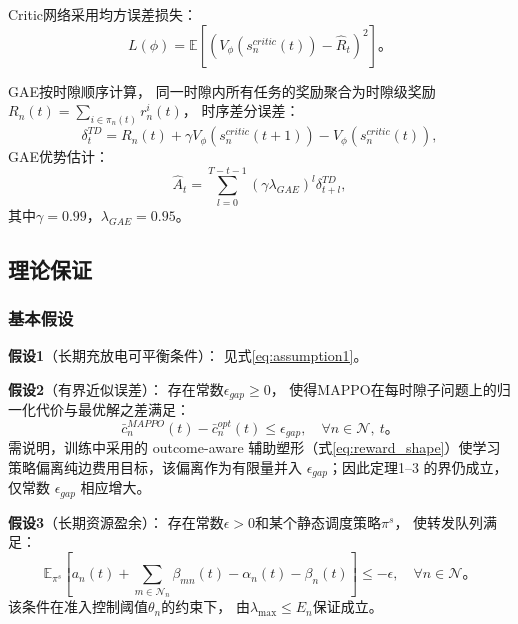 \documentclass[a4paper,11pt]{article}
\begin{document}
Critic网络采用均方误差损失：
\begin{equation}
L(\phi) = \mathbb{E}\left[
(V_\phi(s^{critic}_n(t)) - \hat{R}_t)^2
\right]。
\label{eq:critic_loss}
\end{equation}

GAE按时隙顺序计算，
同一时隙内所有任务的奖励聚合为时隙级奖励
$R_n(t) = \sum_{i \in \pi_n(t)} r^i_n(t)$，
时序差分误差：
\begin{equation}
\delta^{TD}_t = R_n(t) + \gamma V_\phi(s^{critic}_n(t+1))
- V_\phi(s^{critic}_n(t)),
\label{eq:td_error}
\end{equation}
GAE优势估计：
\begin{equation}
\hat{A}_t = \sum_{l=0}^{T-t-1}
(\gamma\lambda_{GAE})^l\delta^{TD}_{t+l},
\label{eq:gae}
\end{equation}
其中$\gamma=0.99$，$\lambda_{GAE}=0.95$。

\subsection{理论保证}

\subsubsection{基本假设}

\textbf{假设1}（长期充放电可平衡条件）：
见式\eqref{eq:assumption1}。

\textbf{假设2}（有界近似误差）：
存在常数$\epsilon_{gap} \geq 0$，
使得MAPPO在每时隙子问题上的归一化代价与最优解之差满足：
\begin{equation}
\bar{c}^{MAPPO}_n(t) - \bar{c}^{opt}_n(t)
\leq \epsilon_{gap},
\quad \forall n \in \mathcal{N},\ t。
\label{eq:assumption2}
\end{equation}
需说明，训练中采用的 outcome-aware 辅助塑形（式\eqref{eq:reward_shape}）使学习策略偏离纯边费用目标，该偏离作为有限量并入 $\epsilon_{gap}$；因此定理1--3 的界仍成立，仅常数 $\epsilon_{gap}$ 相应增大。

\textbf{假设3}（长期资源盈余）：
存在常数$\epsilon > 0$和某个静态调度策略$\pi^s$，
使转发队列满足：
\begin{equation}
\mathbb{E}_{\pi^s}\left[a_n(t)
+ \sum_{m\in\mathcal{N}_n}\beta_{mn}(t)
- \alpha_n(t) - \beta_n(t)\right]
\leq -\epsilon,
\quad \forall n \in \mathcal{N}。
\label{eq:assumption3}
\end{equation}
该条件在准入控制阈值$\theta_n$的约束下，
由$\lambda_{\max} \leq E_n$保证成立。
\end{document}
